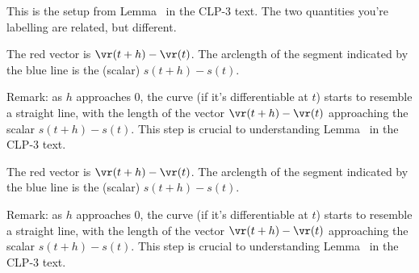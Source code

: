 \begin{hint}
This is the setup from Lemma~ in the CLP-3 text. 
The two quantities you're labelling are related, but different.
\end{hint}
\begin{answer}

\begin{center}
\end{center}
The red vector is $\vr(t+h)-\vr(t)$. The arclength of the segment indicated by the blue line is the (scalar) $s(t+h)-s(t)$.

Remark: as $h$ approaches 0, the curve (if it's differentiable at $t$) starts to resemble a straight line, with the length of the vector $\vr(t+h)-\vr(t)$ approaching the scalar $s(t+h)-s(t)$. This step is crucial to understanding Lemma~ in the CLP-3 text. 
\end{answer}
\begin{solution}

\begin{center}
\end{center}
The red vector is $\vr(t+h)-\vr(t)$. The arclength of the segment indicated by the blue line is the (scalar) $s(t+h)-s(t)$.

Remark: as $h$ approaches 0, the curve (if it's differentiable at $t$) starts to resemble a straight line, with the length of the vector $\vr(t+h)-\vr(t)$ approaching the scalar $s(t+h)-s(t)$. This step is crucial to understanding Lemma~ in the CLP-3 text. 

\end{solution}
